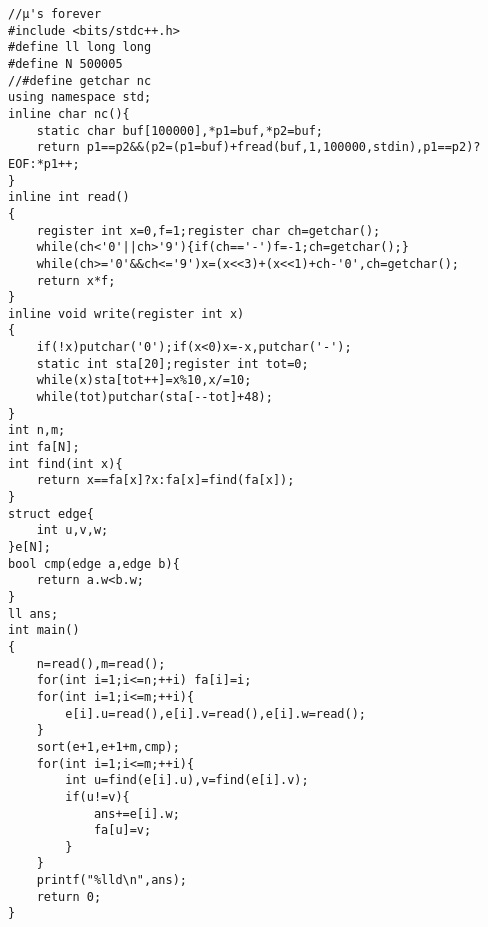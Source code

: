 \begin{verbatim}
//μ's forever
#include <bits/stdc++.h>
#define ll long long 
#define N 500005
//#define getchar nc
using namespace std;
inline char nc(){
    static char buf[100000],*p1=buf,*p2=buf;
    return p1==p2&&(p2=(p1=buf)+fread(buf,1,100000,stdin),p1==p2)?EOF:*p1++;
}
inline int read()
{
    register int x=0,f=1;register char ch=getchar();
    while(ch<'0'||ch>'9'){if(ch=='-')f=-1;ch=getchar();}
    while(ch>='0'&&ch<='9')x=(x<<3)+(x<<1)+ch-'0',ch=getchar();
    return x*f;
}
inline void write(register int x)
{
    if(!x)putchar('0');if(x<0)x=-x,putchar('-');
    static int sta[20];register int tot=0;
    while(x)sta[tot++]=x%10,x/=10;
    while(tot)putchar(sta[--tot]+48);
}
int n,m;
int fa[N];
int find(int x){
    return x==fa[x]?x:fa[x]=find(fa[x]);
}
struct edge{
    int u,v,w;
}e[N];
bool cmp(edge a,edge b){
    return a.w<b.w;
}
ll ans;
int main()
{
    n=read(),m=read();
    for(int i=1;i<=n;++i) fa[i]=i;
    for(int i=1;i<=m;++i){
        e[i].u=read(),e[i].v=read(),e[i].w=read();
    }
    sort(e+1,e+1+m,cmp);
    for(int i=1;i<=m;++i){
        int u=find(e[i].u),v=find(e[i].v);
        if(u!=v){
            ans+=e[i].w;
            fa[u]=v;
        }
    }
    printf("%lld\n",ans);
    return 0;
}
\end{verbatim}

